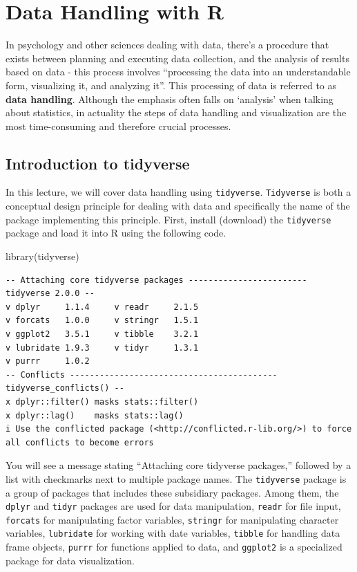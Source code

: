 \documentclass[
  a4paper,
]{book}
\newenvironment{Shaded}{\begin{snugshade}}{\end{snugshade}}
\newcommand{\FunctionTok}[1]{\textcolor[rgb]{0.28,0.35,0.67}{#1}}
\newcommand{\NormalTok}[1]{\textcolor[rgb]{0.00,0.23,0.31}{#1}}
\begin{document}

\chapter{Data Handling with R}\label{data-handling-with-r}

In psychology and other sciences dealing with data, there's a procedure
that exists between planning and executing data collection, and the
analysis of results based on data - this process involves ``processing
the data into an understandable form, visualizing it, and analyzing
it''. This processing of data is referred to as \textbf{data handling}.
Although the emphasis often falls on `analysis' when talking about
statistics, in actuality the steps of data handling and visualization
are the most time-consuming and therefore crucial processes.

\section{Introduction to tidyverse}\label{introduction-to-tidyverse}

In this lecture, we will cover data handling using \texttt{tidyverse}.
\texttt{Tidyverse} is both a conceptual design principle for dealing
with data and specifically the name of the package implementing this
principle. First, install (download) the \texttt{tidyverse} package and
load it into R using the following code.

\begin{Shaded}
\begin{Highlighting}[]
\FunctionTok{library}\NormalTok{(tidyverse)}
\end{Highlighting}
\end{Shaded}

\begin{verbatim}
-- Attaching core tidyverse packages ------------------------ tidyverse 2.0.0 --
v dplyr     1.1.4     v readr     2.1.5
v forcats   1.0.0     v stringr   1.5.1
v ggplot2   3.5.1     v tibble    3.2.1
v lubridate 1.9.3     v tidyr     1.3.1
v purrr     1.0.2     
-- Conflicts ------------------------------------------ tidyverse_conflicts() --
x dplyr::filter() masks stats::filter()
x dplyr::lag()    masks stats::lag()
i Use the conflicted package (<http://conflicted.r-lib.org/>) to force all conflicts to become errors
\end{verbatim}

You will see a message stating ``Attaching core tidyverse packages,''
followed by a list with checkmarks next to multiple package names. The
\texttt{tidyverse} package is a group of packages that includes these
subsidiary packages. Among them, the \texttt{dplyr} and \texttt{tidyr}
packages are used for data manipulation, \texttt{readr} for file input,
\texttt{forcats} for manipulating factor variables, \texttt{stringr} for
manipulating character variables, \texttt{lubridate} for working with
date variables, \texttt{tibble} for handling data frame objects,
\texttt{purrr} for functions applied to data, and \texttt{ggplot2} is a
specialized package for data visualization.
\end{document}
